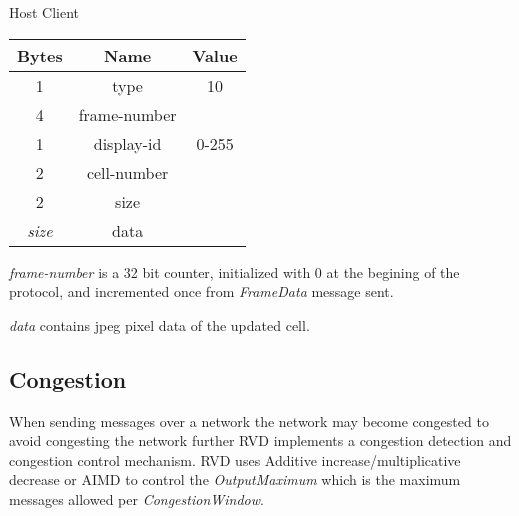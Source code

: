 \begin{center}
    Host \textrightarrow Client\\
    \begin{tabular}{|c|c|c|}
        \hline
        \textbf{Bytes} & \textbf{Name} & \textbf{Value} \\
        \hline
        1              & type          & 10             \\
        \hline
        4              & frame-number  &                \\
        \hline
        1              & display-id    & 0-255          \\
        \hline
        2              & cell-number   &                \\
        \hline
        2              & size          &                \\
        \hline
        \emph{size}    & data          &                \\
        \hline
    \end{tabular}
\end{center}

\emph{frame-number} is a 32 bit counter, initialized with 0 at the begining of the protocol, and incremented once
from \emph{FrameData} message sent.

\emph{data} contains jpeg pixel data of the updated cell.

\subsection{Congestion}

When sending messages over a network the network may become congested to avoid congesting the network further RVD
implements a congestion detection and congestion control mechanism. RVD uses Additive increase/multiplicative
decrease or AIMD to control the \emph{OutputMaximum} which is the maximum messages allowed per
\emph{CongestionWindow}.